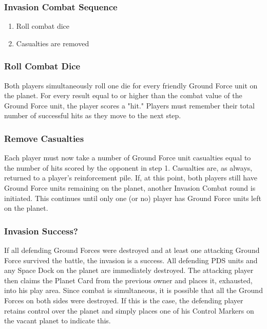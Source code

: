 \documentclass[11pt,fleqn]{book} %
\begin{document}
\subsubsection{Invasion Combat Sequence}
\begin{enumerate}
\item Roll combat dice
\item Casualties are removed
\end{enumerate}

\subsubsection{Roll Combat Dice}
Both players simultaneously roll one die for every friendly Ground Force unit on the planet. For every result equal to or higher than the combat value of the Ground Force unit, the player scores a "hit." Players must remember their total number of successful hits as they move to the next step.

\subsubsection{Remove Casualties}
Each player must now take a number of Ground Force unit casualties equal to the number of hits scored by the opponent in step 1. Casualties are, as always, returned to a player's reinforcement pile.
If, at this point, both players still have Ground Force units remaining on the planet, another Invasion Combat round is initiated. This continues until only one (or no) player has Ground Force units left on the planet.

\subsubsection{Invasion Success?}
If all defending Ground Forces were destroyed and at least one attacking Ground Force survived the battle, the invasion is a success. All defending PDS units and any Space Dock on the planet are immediately destroyed. The attacking player then claims the Planet Card from the previous owner and places it, exhausted, into his play area. Since combat is simultaneous, it is possible that all the Ground Forces on both sides were destroyed. If this is the case, the defending player retains control over the planet and simply places one of his Control Markers on the vacant planet to indicate this.

\end{document}
